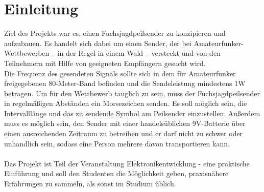 \section{Einleitung}
Ziel des Projekts war es, einen \glqq{}Fuchsjagdpeilsender\grqq{} zu konzipieren und aufzubauen.
Es handelt sich dabei um einen Sender, der bei Amateurfunker-Wettbewerben -- in der Regel in einem
Wald -- versteckt und von den Teilnehmern mit Hilfe von geeigneten Empfängern gesucht wird.\\
Die Frequenz des gesendeten Signals sollte sich in dem für Amateurfunker freigegebenen
80-Meter-Band befinden und die Sendeleistung mindestens 1W betragen. Um für den Wettbewerb
tauglich zu sein, muss der Fuchsjagdpeilsender in regelmäßigen Abständen ein Morsezeichen senden.
Es soll möglich sein, die Intervalllänge und das zu sendende Symbol am Peilsender einzustellen.
Außerdem muss es möglich sein, den Sender mit einer handelsüblichen 9V-Batterie über einen 
ausreichenden Zeitraum zu betreiben und er darf nicht zu schwer oder unhandlich sein, sodass eine
Person mehrere davon transportieren kann. \\\\
Das Projekt ist Teil der Veranstaltung \glqq{}Elektronikentwicklung - eine praktische 
Einführung\grqq{} und soll den Studenten die Möglichkeit geben, praxisnähere Erfahrungen zu sammeln,
als sonst im Studium üblich.